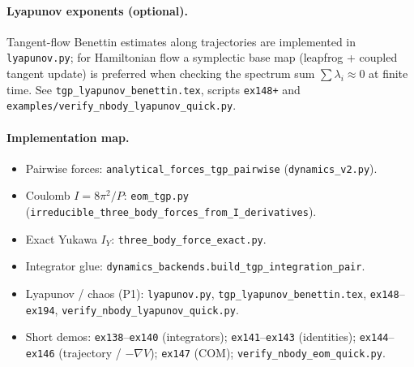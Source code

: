\paragraph{Lyapunov exponents (optional).}
Tangent-flow Benettin estimates along trajectories are implemented in \texttt{lyapunov.py}; for Hamiltonian flow a symplectic base map (leapfrog + coupled tangent update) is preferred when checking the spectrum sum $\sum\lambda_i\approx 0$ at finite time.
See \texttt{tgp\_lyapunov\_benettin.tex}, scripts \texttt{ex148+} and \texttt{examples/verify\_nbody\_lyapunov\_quick.py}.

\paragraph{Implementation map.}
\begin{itemize}
  \item Pairwise forces: \texttt{analytical\_forces\_tgp\_pairwise} (\texttt{dynamics\_v2.py}).
  \item Coulomb $I=8\pi^2/P$: \texttt{eom\_tgp.py} (\texttt{irreducible\_three\_body\_forces\_from\_I\_derivatives}).
  \item Exact Yukawa $I_Y$: \texttt{three\_body\_force\_exact.py}.
  \item Integrator glue: \texttt{dynamics\_backends.build\_tgp\_integration\_pair}.
  \item Lyapunov / chaos (P1): \texttt{lyapunov.py}, \texttt{tgp\_lyapunov\_benettin.tex}, \texttt{ex148}--\texttt{ex194}, \texttt{verify\_nbody\_lyapunov\_quick.py}.
  \item Short demos: \texttt{ex138}--\texttt{ex140} (integrators); \texttt{ex141}--\texttt{ex143} (identities); \texttt{ex144}--\texttt{ex146} (trajectory / $-\nabla V$); \texttt{ex147} (COM); \texttt{verify\_nbody\_eom\_quick.py}.
\end{itemize}
